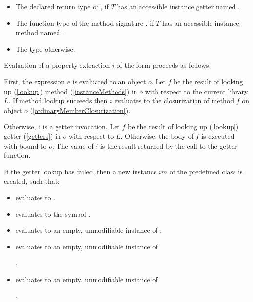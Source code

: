 \documentclass[makeidx]{article}
\begin{document}
\begin{itemize}
\item The declared return type of ,
  if $T$ has an accessible instance getter named \id{}.
\item The function type of the method signature ,
  if $T$ has an accessible instance method named \id{}.
\item The type \DYNAMIC{} otherwise.
\end{itemize}


\LMHash{}%
Evaluation of a property extraction $i$ of the form  proceeds as follows:

\LMHash{}%
First, the expression $e$ is evaluated to an object $o$.
Let $f$ be the result of looking up (\ref{lookup}) method
(\ref{instanceMethods})
\id{} in $o$ with respect to the current library $L$.
If method lookup succeeds then $i$ evaluates to
the closurization of method $f$ on object $o$
(\ref{ordinaryMemberClosurization}).


\LMHash{}%
Otherwise, $i$ is a getter invocation.
Let $f$ be the result of looking up (\ref{lookup}) getter
(\ref{getters})
\id{} in $o$ with respect to $L$.
Otherwise, the body of $f$ is executed with \THIS{} bound to $o$.
The value of $i$ is the result returned by the call to the getter function.

\LMHash{}%
If the getter lookup has failed,
then a new instance $im$ of the predefined class  is created, such that:
\begin{itemize}
\item {} evaluates to \code{\TRUE{}}.
\item {} evaluates to the symbol .
\item {} evaluates to an empty, unmodifiable instance of
.
\item {} evaluates to an empty, unmodifiable instance of

.
\item {} evaluates to an empty, unmodifiable instance of

.
\end{itemize}
\end{document}
